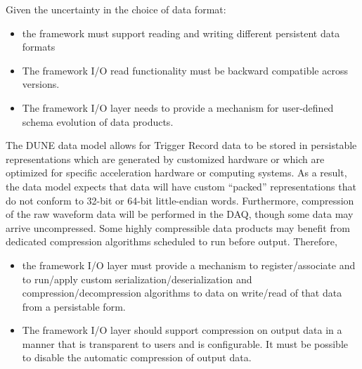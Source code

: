 \documentclass[../main-v1.tex]{subfiles}
\begin{document}
Given the uncertainty in the choice of data format:

\begin{itemize}
\item  the framework must support reading and writing different persistent data formats


\item The framework I/O read functionality must be backward compatible across versions.



\item The framework I/O layer needs to provide a mechanism for user-defined schema evolution of data products.
\end{itemize}
The DUNE data model allows for Trigger Record data to be stored in persistable representations which are generated by customized hardware or which are optimized for specific acceleration hardware or computing systems.  As a result, the data model expects that data will have custom “packed” representations that do not conform to 32-bit or 64-bit little-endian words. Furthermore, compression of the raw waveform data will be performed in the DAQ, though some data may arrive uncompressed.  Some highly compressible data products may benefit from dedicated compression algorithms scheduled to run before output. Therefore, 

\begin{itemize}
\item the framework I/O layer must provide a mechanism to register/associate and to run/apply custom serialization/deserialization and compression/decompression algorithms to data on write/read of that data from a persistable form.  


\item The framework I/O layer should support compression on output data in a manner that is transparent to users and is configurable.  It must be possible to disable the automatic compression of output data.
\end{itemize}
\end{document}

